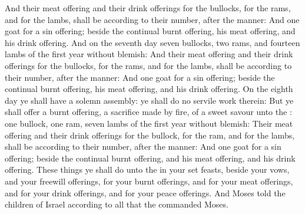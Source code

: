 \begin{biblechapter}
\verse And their meat offering and their drink offerings for the bullocks, for the rams, and for the lambs, shall be according to their number, after the manner:
\verse And one goat for a sin offering; beside the continual burnt offering, his meat offering, and his drink offering.
\verse And on the seventh day seven bullocks, two rams, and fourteen lambs of the first year without blemish:
\verse And their meat offering and their drink offerings for the bullocks, for the rams, and for the lambs, shall be according to their number, after the manner:
\verse And one goat for a sin offering; beside the continual burnt offering, his meat offering, and his drink offering.
\verse On the eighth day ye shall have a solemn assembly: ye shall do no servile work therein:
\verse But ye shall offer a burnt offering, a sacrifice made by fire, of a sweet savour unto the \LORD: one bullock, one ram, seven lambs of the first year without blemish:
\verse Their meat offering and their drink offerings for the bullock, for the ram, and for the lambs, shall be according to their number, after the manner:
\verse And one goat for a sin offering; beside the continual burnt offering, and his meat offering, and his drink offering.
\verse These things ye shall do unto the \LORD in your set feasts, beside your vows, and your freewill offerings, for your burnt offerings, and for your meat offerings, and for your drink offerings, and for your peace offerings.
\verse And Moses told the children of Israel according to all that the \LORD commanded Moses.
\end{biblechapter}

